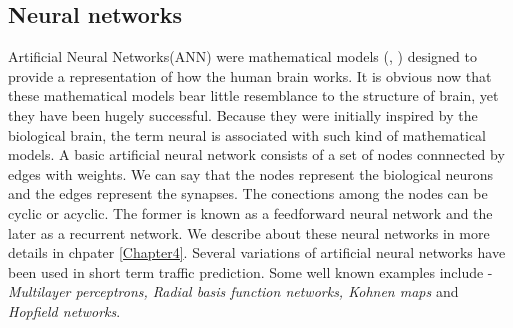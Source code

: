\citet{myung2011travel}

\citet{zhang2013improved}

\citet{meng2015two}


\subsection{Neural networks}
\label{subsec:neuralNetworksTrafficPred}
Artificial Neural Networks(ANN) were mathematical models (\citet{mcculloch1943logical},
\citet{rosenblatt1958perceptron}) designed to  provide a representation of how the human brain
works. It is obvious now that these mathematical models bear little resemblance to the structure
of brain, yet they have been hugely successful. Because they were initially inspired by the
biological brain, the term neural is associated with such kind of mathematical models. A basic
artificial neural network consists of a set of nodes connnected by edges with weights. We can say
that the nodes represent the biological neurons and the edges represent the synapses. The
conections among the nodes can be cyclic or acyclic. The former is known as a feedforward neural
network and the later as a recurrent network. We describe about these neural networks in more
details in chpater \ref{Chapter4}. Several variations of artificial neural networks have been
used in short term traffic prediction. Some well known examples include - \textit{Multilayer
perceptrons, Radial basis function networks, Kohnen maps} and \textit{Hopfield networks}.

